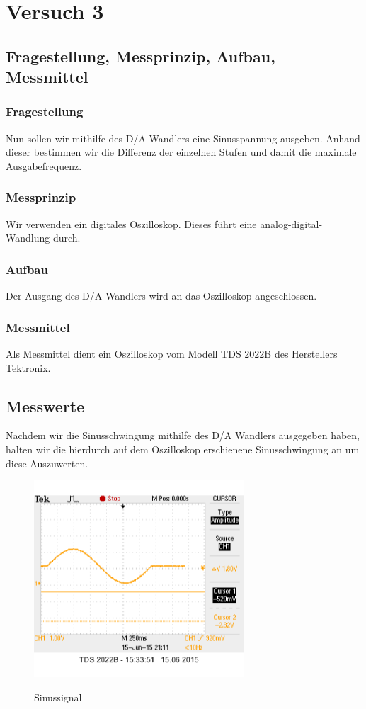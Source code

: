 \documentclass[TGAI_Laborbericht.tex]{subfiles}
\begin{document}
\chapter{Versuch 3}
\label{chap:VERSUCH_3}

\section{Fragestellung, Messprinzip, Aufbau, Messmittel}
\label{chap:VERSUCH_3_FRAGESTELLUNG}
\subsection{Fragestellung}
Nun sollen wir mithilfe des D/A Wandlers eine Sinusspannung ausgeben. Anhand dieser bestimmen wir die Differenz der einzelnen Stufen und damit die maximale Ausgabefrequenz.

\subsection{Messprinzip}
Wir verwenden ein digitales Oszilloskop. Dieses führt eine analog-digital-Wandlung durch.

\subsection{Aufbau}
Der Ausgang des D/A Wandlers wird an das Oszilloskop angeschlossen.

\subsection{Messmittel}
Als Messmittel dient ein Oszilloskop vom Modell TDS 2022B des Herstellers Tektronix. 

\section{Messwerte}
\label{chap:VERSUCH_3_MESSWERTE}
Nachdem wir die Sinusschwingung mithilfe des D/A Wandlers ausgegeben haben, halten wir die hierdurch auf dem Oszilloskop erschienene Sinusschwingung an um diese Auszuwerten.

\begin{figure}[H]
	\includegraphics[width=0.7\textwidth]{media/Sinus.png}
	\label{Hoch}
	\caption{Sinussignal}
\end{figure}
\end{document}
